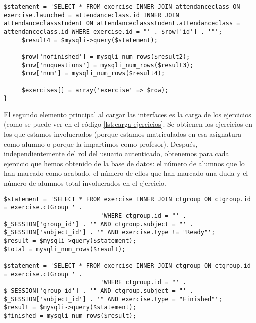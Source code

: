 \begin{lstlisting}[caption=Cargar los ejercicios del tipo pasado por parámetro.,label={lst:carga-ejercicios}]
     $statement = 'SELECT * FROM exercise INNER JOIN attendanceclass ON exercise.launched = attendanceclass.id INNER JOIN attendanceclassstudent ON attendanceclassstudent.attendanceclass = attendanceclass.id WHERE exercise.id = "' . $row['id'] . '"';
     $result4 = $mysqli->query($statement);
               
     $row['nofinished'] = mysqli_num_rows($result2);
     $row['noquestions'] = mysqli_num_rows($result3);
     $row['num'] = mysqli_num_rows($result4);
                
     $exercises[] = array('exercise' => $row);
}
\end{lstlisting}

El segundo elemento principal al cargar las interfaces es la carga de los ejercicios (como se puede ver en el código \ref{lst:carga-ejercicios}. Se obtienen los ejercicios en los que estamos involucrados (porque estamos matriculados en esa asignatura como alumno o porque la impartimos como profesor). Después, independientemente del rol del usuario autenticado, obtenemos para cada ejercicio que hemos obtenido de la base de datos: el número de alumnos que lo han marcado como acabado, el número de ellos que han marcado una duda y el número de alumnos total involucrados en el ejercicio.\\

\noindent
\begin{lstlisting}[caption=Obtener información para la carga de la barra de progreso del profesor.,label={lst:progress-bar-info-teacher}]
$statement = 'SELECT * FROM exercise INNER JOIN ctgroup ON ctgroup.id = exercise.ctGroup ' .
                           'WHERE ctgroup.id = "' . $_SESSION['group_id'] . '" AND ctgroup.subject = "' . $_SESSION['subject_id'] . '" AND exercise.type != "Ready"';
$result = $mysqli->query($statement);
$total = mysqli_num_rows($result);

$statement = 'SELECT * FROM exercise INNER JOIN ctgroup ON ctgroup.id = exercise.ctGroup ' .
                           'WHERE ctgroup.id = "' . $_SESSION['group_id'] . '" AND ctgroup.subject = "' . $_SESSION['subject_id'] . '" AND exercise.type = "Finished"';
$result = $mysqli->query($statement);
$finished = mysqli_num_rows($result);
\end{lstlisting}

